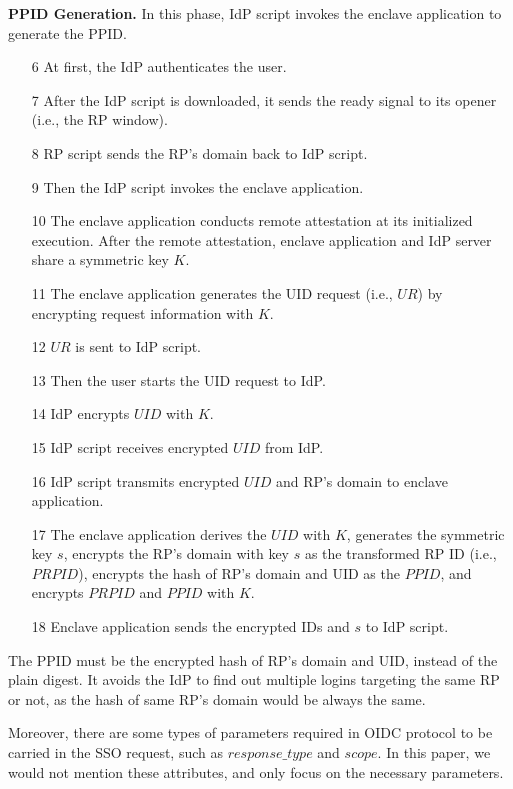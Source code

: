 \vspace{3mm}\noindent\textbf{PPID Generation.} In this phase, IdP script invokes the enclave application to generate the PPID. 
\begin{itemize}
\item[6]At first, the IdP authenticates the user.
\item[7]After the IdP script is downloaded, it sends the ready signal to its opener (i.e., the RP window).
\item[8]RP script sends the RP's domain back to IdP script. 
\item[9]Then the IdP script invokes the enclave application.
\item[10]The enclave application conducts remote attestation at its initialized execution. After the remote attestation, enclave application and IdP server share a symmetric key $K$.
\item[11]The enclave application generates the UID request (i.e., $UR$) by encrypting request information with $K$.
\item[12]$UR$ is sent to IdP script.
\item[13]Then the user starts the UID request to IdP.
\item[14]IdP encrypts $UID$ with $K$.
\item[15]IdP script receives encrypted $UID$ from IdP.
\item[16]IdP script transmits encrypted $UID$ and RP's domain to enclave application.
\item[17]The enclave application derives the $UID$ with $K$, generates the symmetric key $s$, encrypts the RP's domain with key $s$ as the transformed RP ID (i.e., $PRPID$), encrypts the hash of RP's domain and UID as the $PPID$, and encrypts $PRPID$ and $PPID$ with $K$.
\item[18]Enclave application sends the encrypted IDs and $s$ to IdP script. 
\end{itemize} 
The PPID must be the encrypted hash of RP's domain and UID, instead of the plain digest. It avoids the IdP to find out multiple logins targeting the same RP or not, as the hash of same RP's domain would be always the same. 

Moreover, there are some types of parameters required in OIDC protocol to be carried in the SSO request, such as $response\_type$ and $scope$. In this paper, we would not mention these attributes, and only focus on the necessary parameters. 

